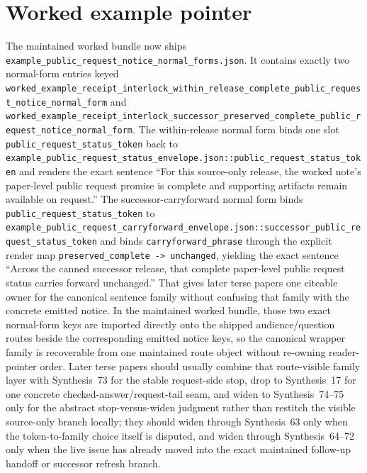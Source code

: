 \documentclass[11pt]{article}
\begin{document}
\section{Worked example pointer}
The maintained worked bundle now ships \nolinkurl{example_public_request_notice_normal_forms.json}.\cite{series:workedexample}
It contains exactly two normal-form entries keyed \nolinkurl{worked_example_receipt_interlock_within_release_complete_public_request_notice_normal_form} and \nolinkurl{worked_example_receipt_interlock_successor_preserved_complete_public_request_notice_normal_form}.
The within-release normal form binds one slot \nolinkurl{public_request_status_token} back to \nolinkurl{example_public_request_status_envelope.json::public_request_status_token} and renders the exact sentence ``For this source-only release, the worked note's paper-level public request promise is complete and supporting artifacts remain available on request.''
The successor-carryforward normal form binds \nolinkurl{public_request_status_token} to \nolinkurl{example_public_request_carryforward_envelope.json::successor_public_request_status_token} and binds \nolinkurl{carryforward_phrase} through the explicit render map \nolinkurl{preserved_complete -> unchanged}, yielding the exact sentence ``Across the canned successor release, that complete paper-level public request status carries forward unchanged.''
That gives later terse papers one citeable owner for the canonical sentence family without confusing that family with the concrete emitted notice. In the maintained worked bundle, those two exact normal-form keys are imported directly onto the shipped audience/question routes beside the corresponding emitted notice keys, so the canonical wrapper family is recoverable from one maintained route object without re-owning reader-pointer order. Later terse papers should usually combine that route-visible family layer with Synthesis~73 for the stable request-side stop, drop to Synthesis~17 for one concrete checked-answer/request-tail seam, and widen to Synthesis~74--75 only for the abstract stop-versus-widen judgment rather than restitch the visible source-only branch locally; they should widen through Synthesis~63 only when the token-to-family choice itself is disputed, and widen through Synthesis~64--72 only when the live issue has already moved into the exact maintained follow-up handoff or successor refresh branch.\cite{series:publicrequestnoticeselections,series:publicrequestresponsemenus,series:publicrequestresponsepackets,series:publicrequestresponsepacketcarryforward,series:publicrequestresponsepacketdeltaledgers,series:publicrequestresponsepacketrefreshnotices,series:publicrequestresponsepacketrefreshnoticenormalforms,series:publicrequestresponsepacketrefreshnoticeselections,series:publicrequestresponsepacketrefreshresponsemenus,series:publicrequestresponsepacketrefreshresponsepackets,series:publicrequestresponsepacketrefreshresponsepacketclosureverdicts,series:pairedterminalcitationdiscipline,series:pairedterminalcutoverrule}
\end{document}
